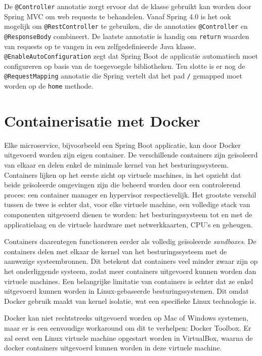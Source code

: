 De \texttt{@Controller} annotatie zorgt ervoor dat de klasse gebruikt kan worden door Spring MVC om web requests te behandelen. Vanaf Spring 4.0 is het ook mogelijk om \texttt{@RestController} te gebruiken, die de annotaties \texttt{@Controller} en \texttt{@ResponseBody} combineert. De laatste annotatie is handig om \texttt{return} waarden van requests op te vangen in een zelfgedefinieerde Java klasse. \texttt{@EnableAutoConfiguration} zegt dat Spring Boot de applicatie automatisch moet configureren op basis van de toegevoegde bibliotheken. Ten slotte is er nog de \texttt{@RequestMapping} annotatie die Spring vertelt dat het pad \texttt{/} gemapped moet worden op de \texttt{home} methode.

\section{Containerisatie met Docker}
\label{sec:docker}

Elke microservice, bijvoorbeeld een Spring Boot applicatie, kan door Docker uitgevoerd worden zijn eigen container. De verschillende containers zijn geïsoleerd van elkaar en delen enkel de minimale kernel van het besturingssysteem. Containers lijken op het eerste zicht op virtuele machines, in het opzicht dat beide geïsoleerde omgevingen zijn die beheerd worden door een controlerend proces: een container manager en hypervisor respectievelijk. Het grootste verschil tussen de twee is echter dat, voor elke virtuele machine, een volledige stack van componenten uitgevoerd dienen te worden: het besturingssysteem tot en met de applicatielaag en de virtuele hardware met netwerkkaarten, CPU's en geheugen.

Containers daarentegen functioneren eerder als volledig geïsoleerde \textit{sandboxes}. De containers delen met elkaar de kernel van het besturingssysteem met de aanwezige systeembronnen. Dit betekent dat containers veel minder zwaar zijn op het onderliggende systeem, zodat meer containers uitgevoerd kunnen worden dan virtuele machines. Een belangrijke limitatie van containers is echter dat ze enkel uitgevoerd kunnen worden in Linux-gebaseerde besturingssystemen. Dit omdat Docker gebruik maakt van kernel isolatie, wat een specifieke Linux technologie is.

Docker kan niet rechtstreeks uitgevoerd worden op Mac of Windows systemen, maar er is een eenvoudige workaround om dit te verhelpen: Docker Toolbox. Er zal eerst een Linux virtuele machine opgestart worden in VirtualBox, waarna de docker containers uitgevoerd kunnen worden in deze virtuele machine.


